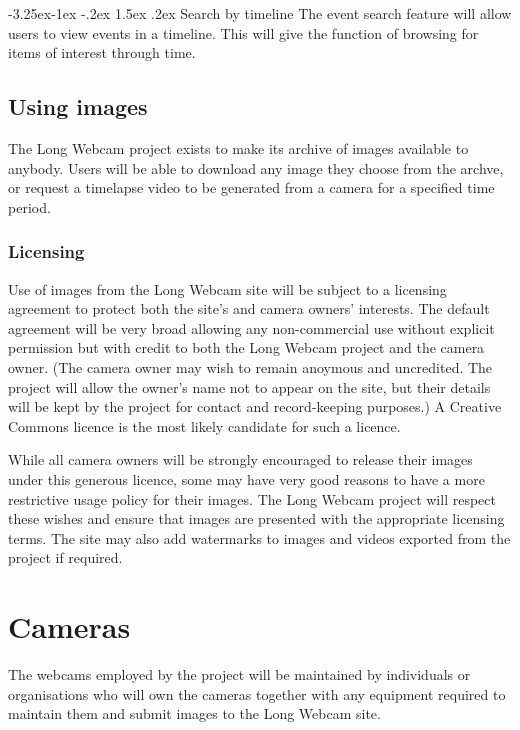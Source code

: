 \documentclass[11pt,a4paper]{article}
\makeatletter
\renewcommand\paragraph{\@startsection{paragraph}{4}{\z@}%
  {-3.25ex\@plus -1ex \@minus -.2ex}%
  {1.5ex \@plus .2ex}%
  {\normalfont\normalsize\bfseries}}
\makeatother
\begin{document}
\paragraph{Search by timeline}
The event search feature will allow users to view events in a timeline. This will give the function of browsing for items of interest through time.

\subsection{Using images}
The Long Webcam project exists to make its archive of images available to anybody. Users will be able to download any image they choose from the archve, or request a timelapse video to be generated from a camera for a specified time period.

\subsubsection{Licensing}
\label{section:licensing}
Use of images from the Long Webcam site will be subject to a licensing agreement to protect both the site's and camera owners' interests. The default agreement will be very broad allowing any non-commercial use without explicit permission but with credit to both the Long Webcam project and the camera owner. (The camera owner may wish to remain anoymous and uncredited. The project will allow the owner's name not to appear on the site, but their details will be kept by the project for contact and record-keeping purposes.) A Creative Commons licence is the most likely candidate for such a licence.

While all camera owners will be strongly encouraged to release their images under this generous licence, some may have very good reasons to have a more restrictive usage policy for their images. The Long Webcam project will respect these wishes and ensure that images are presented with the appropriate licensing terms. The site may also add watermarks to images and videos exported from the project if required.

\section{Cameras}
\label{cameras}
The webcams employed by the project will be maintained by individuals or organisations who will own the cameras together with any equipment required to maintain them and submit images to the Long Webcam site.
\end{document}
